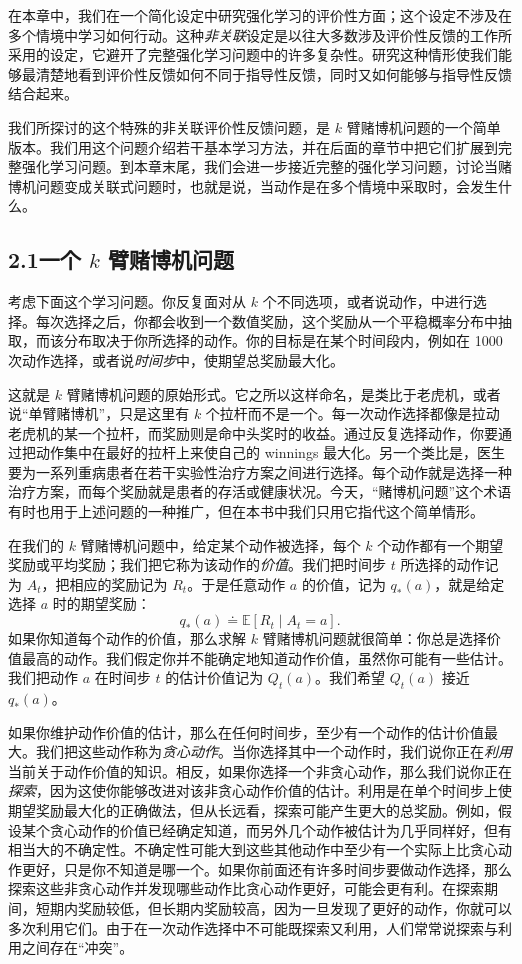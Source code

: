 \documentclass[UTF8, 12pt, fontset=fandol, oneside]{ctexart}
\begin{document}
在本章中，我们在一个简化设定中研究强化学习的评价性方面；这个设定不涉及在多个情境中学习如何行动。这种\emph{非关联}设定是以往大多数涉及评价性反馈的工作所采用的设定，它避开了完整强化学习问题中的许多复杂性。研究这种情形使我们能够最清楚地看到评价性反馈如何不同于指导性反馈，同时又如何能够与指导性反馈结合起来。

我们所探讨的这个特殊的非关联评价性反馈问题，是 $k$ 臂赌博机问题的一个简单版本。我们用这个问题介绍若干基本学习方法，并在后面的章节中把它们扩展到完整强化学习问题。到本章末尾，我们会进一步接近完整的强化学习问题，讨论当赌博机问题变成关联式问题时，也就是说，当动作是在多个情境中采取时，会发生什么。

\subsection*{2.1\quad 一个 $k$ 臂赌博机问题}

考虑下面这个学习问题。你反复面对从 $k$ 个不同选项，或者说动作，中进行选择。每次选择之后，你都会收到一个数值奖励，这个奖励从一个平稳概率分布中抽取，而该分布取决于你所选择的动作。你的目标是在某个时间段内，例如在 1000 次动作选择，或者说\emph{时间步}中，使期望总奖励最大化。

这就是 $k$ 臂赌博机问题的原始形式。它之所以这样命名，是类比于老虎机，或者说“单臂赌博机”，只是这里有 $k$ 个拉杆而不是一个。每一次动作选择都像是拉动老虎机的某一个拉杆，而奖励则是命中头奖时的收益。通过反复选择动作，你要通过把动作集中在最好的拉杆上来使自己的 winnings 最大化。另一个类比是，医生要为一系列重病患者在若干实验性治疗方案之间进行选择。每个动作就是选择一种治疗方案，而每个奖励就是患者的存活或健康状况。今天，“赌博机问题”这个术语有时也用于上述问题的一种推广，但在本书中我们只用它指代这个简单情形。

在我们的 $k$ 臂赌博机问题中，给定某个动作被选择，每个 $k$ 个动作都有一个期望奖励或平均奖励；我们把它称为该动作的\emph{价值}。我们把时间步 $t$ 所选择的动作记为 $A_t$，把相应的奖励记为 $R_t$。于是任意动作 $a$ 的价值，记为 $q_*(a)$，就是给定选择 $a$ 时的期望奖励：
\[
q_*(a)\doteq \mathbb{E}[R_t \mid A_t=a].
\]
如果你知道每个动作的价值，那么求解 $k$ 臂赌博机问题就很简单：你总是选择价值最高的动作。我们假定你并不能确定地知道动作价值，虽然你可能有一些估计。我们把动作 $a$ 在时间步 $t$ 的估计价值记为 $Q_t(a)$。我们希望 $Q_t(a)$ 接近 $q_*(a)$。

如果你维护动作价值的估计，那么在任何时间步，至少有一个动作的估计价值最大。我们把这些动作称为\emph{贪心动作}。当你选择其中一个动作时，我们说你正在\emph{利用}当前关于动作价值的知识。相反，如果你选择一个非贪心动作，那么我们说你正在\emph{探索}，因为这使你能够改进对该非贪心动作价值的估计。利用是在单个时间步上使期望奖励最大化的正确做法，但从长远看，探索可能产生更大的总奖励。例如，假设某个贪心动作的价值已经确定知道，而另外几个动作被估计为几乎同样好，但有相当大的不确定性。不确定性可能大到这些其他动作中至少有一个实际上比贪心动作更好，只是你不知道是哪一个。如果你前面还有许多时间步要做动作选择，那么探索这些非贪心动作并发现哪些动作比贪心动作更好，可能会更有利。在探索期间，短期内奖励较低，但长期内奖励较高，因为一旦发现了更好的动作，你就可以多次利用它们。由于在一次动作选择中不可能既探索又利用，人们常常说探索与利用之间存在“冲突”。
\end{document}
